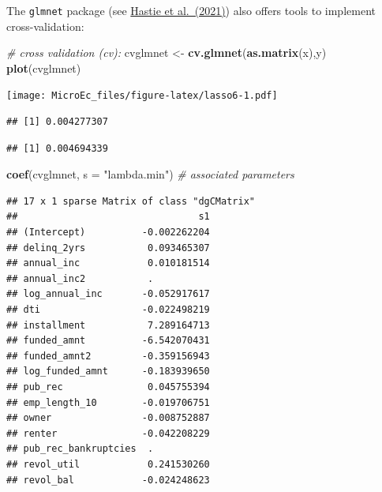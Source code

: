 \documentclass[
  12pt,
]{book}
\newenvironment{Shaded}{\begin{snugshade}}{\end{snugshade}}
\newcommand{\AttributeTok}[1]{\textcolor[rgb]{0.13,0.29,0.53}{#1}}
\newcommand{\CommentTok}[1]{\textcolor[rgb]{0.56,0.35,0.01}{\textit{#1}}}
\newcommand{\FloatTok}[1]{\textcolor[rgb]{0.00,0.00,0.81}{#1}}
\newcommand{\FunctionTok}[1]{\textcolor[rgb]{0.13,0.29,0.53}{\textbf{#1}}}
\newcommand{\NormalTok}[1]{#1}
\newcommand{\OtherTok}[1]{\textcolor[rgb]{0.56,0.35,0.01}{#1}}
\newcommand{\SpecialCharTok}[1]{\textcolor[rgb]{0.81,0.36,0.00}{\textbf{#1}}}
\newcommand{\StringTok}[1]{\textcolor[rgb]{0.31,0.60,0.02}{#1}}
\theoremstyle{definition}
\theoremstyle{definition}
\theoremstyle{definition}
\theoremstyle{definition}
\theoremstyle{remark}
\begin{document}
The \texttt{glmnet} package (see \href{https://glmnet.stanford.edu/articles/glmnet.html}{Hastie et al.~(2021)}) also offers tools to implement cross-validation:

\begin{Shaded}
\begin{Highlighting}[]
\CommentTok{\# cross validation (cv):}
\NormalTok{cvglmnet }\OtherTok{\textless{}{-}} \FunctionTok{cv.glmnet}\NormalTok{(}\FunctionTok{as.matrix}\NormalTok{(x),y)}
\FunctionTok{plot}\NormalTok{(cvglmnet)}
\end{Highlighting}
\end{Shaded}

\texttt{[image: MicroEc\_files/figure-latex/lasso6-1.pdf]}

\begin{Shaded}
\end{Shaded}

\begin{verbatim}
## [1] 0.004277307
\end{verbatim}

\begin{Shaded}
\end{Shaded}

\begin{verbatim}
## [1] 0.004694339
\end{verbatim}

\begin{Shaded}
\begin{Highlighting}[]
\FunctionTok{coef}\NormalTok{(cvglmnet, }\AttributeTok{s =} \StringTok{"lambda.min"}\NormalTok{) }\CommentTok{\# associated parameters}
\end{Highlighting}
\end{Shaded}

\begin{verbatim}
## 17 x 1 sparse Matrix of class "dgCMatrix"
##                                s1
## (Intercept)          -0.002262204
## delinq_2yrs           0.093465307
## annual_inc            0.010181514
## annual_inc2           .          
## log_annual_inc       -0.052917617
## dti                  -0.022498219
## installment           7.289164713
## funded_amnt          -6.542070431
## funded_amnt2         -0.359156943
## log_funded_amnt      -0.183939650
## pub_rec               0.045755394
## emp_length_10        -0.019706751
## owner                -0.008752887
## renter               -0.042208229
## pub_rec_bankruptcies  .          
## revol_util            0.241530260
## revol_bal            -0.024248623
\end{verbatim}
\end{document}
